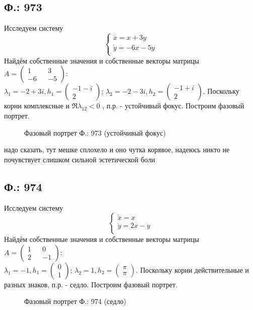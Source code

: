 \documentclass{article}
\begin{document}
\subsection{Ф.: 973}
Исследуем систему 
\begin{equation}
\begin{cases}
        \dot{x}=x+3y\\
        \dot{y}=-6x-5y\\
    \end{cases}    
\end{equation}
Найдём собственные значения и собственные векторы матрицы $A=\begin{pmatrix}1 && 3\\ -6 && -5 \end{pmatrix}$:\\
 $\lambda_1= -2+3i,h_1 = \begin{pmatrix} -1-i  \\  2 \end{pmatrix} $; $\lambda_2= -2-3i,h_2 = \begin{pmatrix} -1+i  \\  2 \end{pmatrix} $. Поскольку корни комплексные и $\Re{\lambda_{12}}<0$ , п.р. - устойчивый фокус. Построим фазовый портрет.
 \begin{figure}[ht]
\caption{Фазовый портрет Ф.: 973 (устойчивый фокус)}
\label{973}
\end{figure}
\textcolor[rgb]{1,1,1}{надо сказать, тут мешке сплохело и оно чутка корявое, надеюсь никто не почувствует слишком сильной эстетической боли}


\subsection{Ф.: 974}
Исследуем систему 
\begin{equation}
\begin{cases}
        \dot{x}=x\\
        \dot{y}=2x-y\\
    \end{cases}    
\end{equation}
Найдём собственные значения и собственные векторы матрицы $A=\begin{pmatrix}1 && 0 \\ 2 && -1 \end{pmatrix}$:\\
 $\lambda_1= -1,h_1 = \begin{pmatrix} 0  \\  1 \end{pmatrix} $; $\lambda_2= 1,h_2 = \begin{pmatrix} \pi  \\  \pi \end{pmatrix} $. Поскольку корни действительные и разных знаков, п.р. - седло. Построим фазовый портрет.
 \begin{figure}[ht]
\caption{Фазовый портрет Ф.: 974 (седло)}
\label{974}
\end{figure}\\
\end{document}
